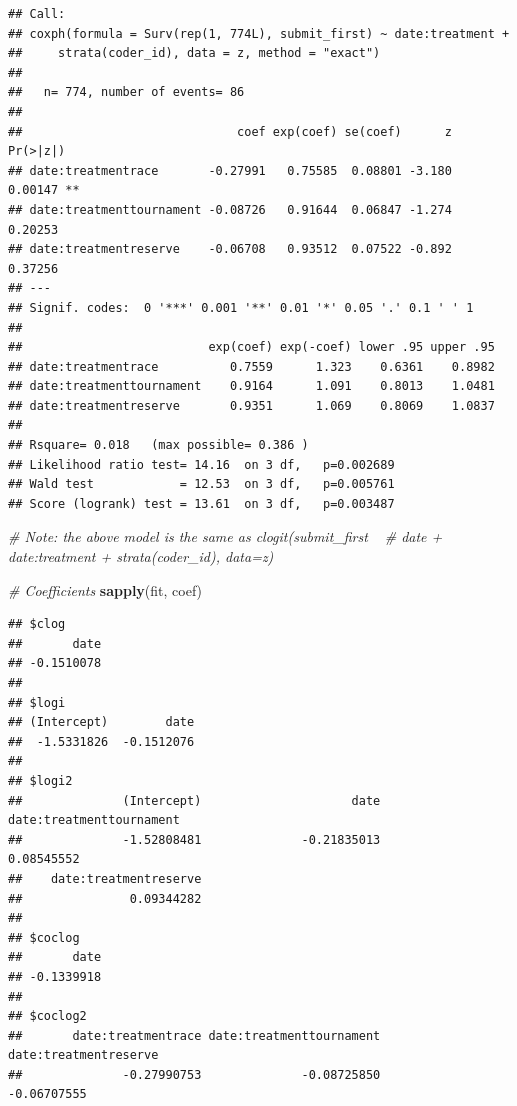 \documentclass[]{article}
\newenvironment{Shaded}{\begin{snugshade}}{\end{snugshade}}
\newcommand{\KeywordTok}[1]{\textcolor[rgb]{0.13,0.29,0.53}{\textbf{#1}}}
\newcommand{\DataTypeTok}[1]{\textcolor[rgb]{0.13,0.29,0.53}{#1}}
\newcommand{\StringTok}[1]{\textcolor[rgb]{0.31,0.60,0.02}{#1}}
\newcommand{\CommentTok}[1]{\textcolor[rgb]{0.56,0.35,0.01}{\textit{#1}}}
\newcommand{\OperatorTok}[1]{\textcolor[rgb]{0.81,0.36,0.00}{\textbf{#1}}}
\newcommand{\NormalTok}[1]{#1}
\let\oldShaded\Shaded
\let\endoldShaded\endShaded
\renewenvironment{Shaded}{\footnotesize\oldShaded}{\endoldShaded}
\begin{document}
\begin{Shaded}
\end{Shaded}

\begin{verbatim}
## Call:
## coxph(formula = Surv(rep(1, 774L), submit_first) ~ date:treatment + 
##     strata(coder_id), data = z, method = "exact")
## 
##   n= 774, number of events= 86 
## 
##                              coef exp(coef) se(coef)      z Pr(>|z|)   
## date:treatmentrace       -0.27991   0.75585  0.08801 -3.180  0.00147 **
## date:treatmenttournament -0.08726   0.91644  0.06847 -1.274  0.20253   
## date:treatmentreserve    -0.06708   0.93512  0.07522 -0.892  0.37256   
## ---
## Signif. codes:  0 '***' 0.001 '**' 0.01 '*' 0.05 '.' 0.1 ' ' 1
## 
##                          exp(coef) exp(-coef) lower .95 upper .95
## date:treatmentrace          0.7559      1.323    0.6361    0.8982
## date:treatmenttournament    0.9164      1.091    0.8013    1.0481
## date:treatmentreserve       0.9351      1.069    0.8069    1.0837
## 
## Rsquare= 0.018   (max possible= 0.386 )
## Likelihood ratio test= 14.16  on 3 df,   p=0.002689
## Wald test            = 12.53  on 3 df,   p=0.005761
## Score (logrank) test = 13.61  on 3 df,   p=0.003487
\end{verbatim}

\begin{Shaded}
\begin{Highlighting}[]
\CommentTok{# Note: the above model is the same as clogit(submit_first ~}
\CommentTok{# date + date:treatment + strata(coder_id), data=z)}

\CommentTok{# Coefficients}
\KeywordTok{sapply}\NormalTok{(fit, coef)}
\end{Highlighting}
\end{Shaded}

\begin{verbatim}
## $clog
##       date 
## -0.1510078 
## 
## $logi
## (Intercept)        date 
##  -1.5331826  -0.1512076 
## 
## $logi2
##              (Intercept)                     date date:treatmenttournament 
##              -1.52808481              -0.21835013               0.08545552 
##    date:treatmentreserve 
##               0.09344282 
## 
## $coclog
##       date 
## -0.1339918 
## 
## $coclog2
##       date:treatmentrace date:treatmenttournament    date:treatmentreserve 
##              -0.27990753              -0.08725850              -0.06707555
\end{verbatim}
\end{document}

